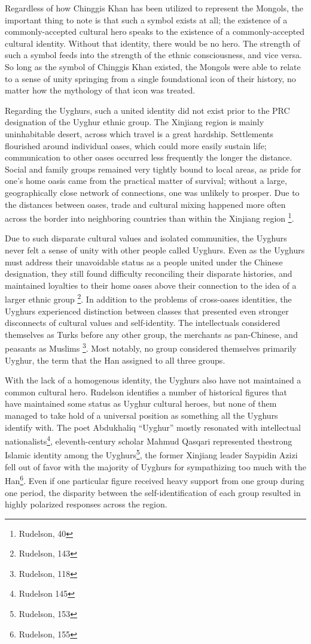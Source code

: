 Regardless of how Chinggis Khan has been utilized to represent the Mongols,
the important thing to note is that such a symbol exists at all; the
existence of a commonly-accepted cultural hero speaks to the existence of a
commonly-accepted cultural identity. Without that identity, there would be no
hero. The strength of such a symbol feeds into the strength of the ethnic
consciousness, and vice versa. So long as the symbol of Chinggis Khan existed,
the Mongols were able to relate to a sense of unity springing from a single
foundational icon of their history, no matter how the mythology of that icon was
treated.

Regarding the Uyghurs, such a united identity did not
exist prior to the PRC designation of the Uyghur ethnic group. The Xinjiang
region is mainly uninhabitable desert, across which travel is a great hardship.
Settlements flourished around individual oases, which could more easily sustain
life; communication to other oases occurred less frequently the longer
the distance. Social and family groups remained very tightly bound to local
areas, as pride for one's home oasis came from the practical matter of
survival; without a large, geographically close network of connections, one was
unlikely to prosper. Due to the distances between oases, trade and cultural
mixing happened more often across the border into neighboring countries than
within the Xinjiang region \footnote{Rudelson, 40}.

Due to such disparate cultural values and isolated communities, the Uyghurs never
felt a sense of unity with other people called Uyghurs. Even as the
Uyghurs must address their unavoidable status as a people united under the
Chinese designation, they still found difficulty reconciling their disparate
histories, and maintained loyalties to their home oases above their connection to
the idea of a larger ethnic group \footnote{Rudelson, 143}. In addition to the
problems of cross-oases identities, the Uyghurs experienced distinction between
classes that presented even stronger disconnects of cultural values and
self-identity. The intellectuals considered themselves as Turks before
any other group, the merchants as pan-Chinese, and peasants as Muslims
\footnote{Rudelson, 118}. Most notably, no group considered themselves
primarily Uyghur, the term that the Han assigned to all three groups.

With the lack of a homogenous identity, the Uyghurs also have not maintained a
common cultural hero. Rudelson identifies a number of historical figures that
have maintained some status as Uyghur cultural heroes, but none of them managed
to take hold of a universal position as something all the Uyghurs identify
with. The poet Abdukhaliq ``Uyghur'' mostly resonated with intellectual
nationalists\footnote{Rudelson 145}, eleventh-century scholar Mahmud Qasqari
represented thestrong Islamic identity among the Uyghurs\footnote{Rudelson,
153}, the former Xinjiang leader Saypidin Azizi fell out of favor with the
majority of Uyghurs for sympathizing too much with the Han\footnote{Rudelson, 155}. Even if
one particular figure received heavy support from one group during one period,
the disparity between the self-identification of each group resulted in highly
polarized responses across the region.

